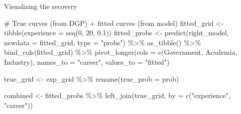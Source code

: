 \documentclass[
  ignorenonframetext,
]{beamer}
\newenvironment{Shaded}{\begin{snugshade}}{\end{snugshade}}
\newcommand{\AttributeTok}[1]{\textcolor[rgb]{0.40,0.45,0.13}{#1}}
\newcommand{\CommentTok}[1]{\textcolor[rgb]{0.37,0.37,0.37}{#1}}
\newcommand{\DecValTok}[1]{\textcolor[rgb]{0.68,0.00,0.00}{#1}}
\newcommand{\FloatTok}[1]{\textcolor[rgb]{0.68,0.00,0.00}{#1}}
\newcommand{\FunctionTok}[1]{\textcolor[rgb]{0.28,0.35,0.67}{#1}}
\newcommand{\NormalTok}[1]{\textcolor[rgb]{0.00,0.23,0.31}{#1}}
\newcommand{\OtherTok}[1]{\textcolor[rgb]{0.00,0.23,0.31}{#1}}
\newcommand{\SpecialCharTok}[1]{\textcolor[rgb]{0.37,0.37,0.37}{#1}}
\newcommand{\StringTok}[1]{\textcolor[rgb]{0.13,0.47,0.30}{#1}}
\begin{document}
\begin{frame}[fragile]{Visualizing the recovery}
\label{visualizing-the-recovery}
\begin{Shaded}
\begin{Highlighting}[]
\CommentTok{\# True curves (from DGP) + fitted curves (from model)}
\NormalTok{fitted\_grid }\OtherTok{\textless{}{-}} \FunctionTok{tibble}\NormalTok{(}\AttributeTok{experience =} \FunctionTok{seq}\NormalTok{(}\DecValTok{0}\NormalTok{, }\DecValTok{20}\NormalTok{, }\FloatTok{0.1}\NormalTok{))}
\NormalTok{fitted\_probs }\OtherTok{\textless{}{-}} \FunctionTok{predict}\NormalTok{(right\_model, }\AttributeTok{newdata =}\NormalTok{ fitted\_grid, }\AttributeTok{type =} \StringTok{"probs"}\NormalTok{) }\SpecialCharTok{\%\textgreater{}\%}
  \FunctionTok{as\_tibble}\NormalTok{() }\SpecialCharTok{\%\textgreater{}\%}
  \FunctionTok{bind\_cols}\NormalTok{(fitted\_grid) }\SpecialCharTok{\%\textgreater{}\%}
  \FunctionTok{pivot\_longer}\NormalTok{(}\AttributeTok{cols =} \FunctionTok{c}\NormalTok{(Government, Academia, Industry),}
               \AttributeTok{names\_to =} \StringTok{"career"}\NormalTok{, }\AttributeTok{values\_to =} \StringTok{"fitted"}\NormalTok{)}

\NormalTok{true\_grid }\OtherTok{\textless{}{-}}\NormalTok{ exp\_grid }\SpecialCharTok{\%\textgreater{}\%} \FunctionTok{rename}\NormalTok{(}\AttributeTok{true\_prob =}\NormalTok{ prob)}

\NormalTok{combined }\OtherTok{\textless{}{-}}\NormalTok{ fitted\_probs }\SpecialCharTok{\%\textgreater{}\%}
  \FunctionTok{left\_join}\NormalTok{(true\_grid, }\AttributeTok{by =} \FunctionTok{c}\NormalTok{(}\StringTok{"experience"}\NormalTok{, }\StringTok{"career"}\NormalTok{))}


\end{Highlighting}
\end{Shaded}
\end{frame}
\end{document}
